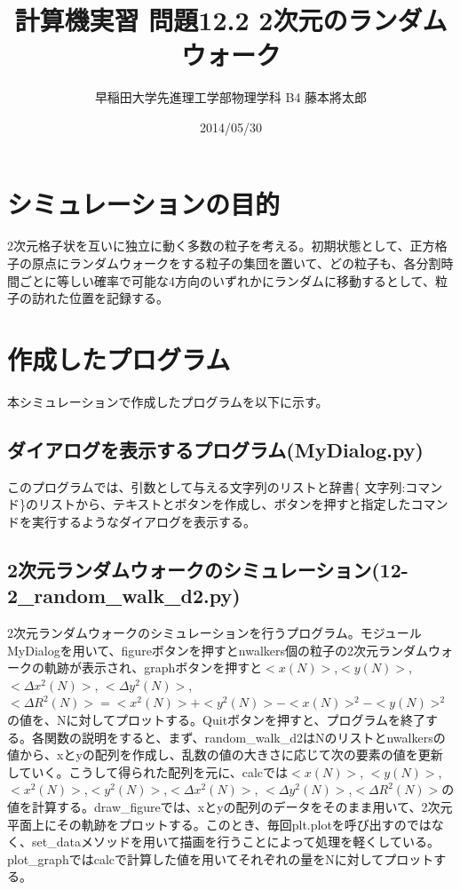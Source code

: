 \documentclass{jsarticle}
\title{計算機実習 問題12.2 2次元のランダムウォーク}
\author{早稲田大学先進理工学部物理学科 B4 藤本將太郎}
\date{2014/05/30}
\begin{document}
\maketitle
    
    \section{シミュレーションの目的}
        2次元格子状を互いに独立に動く多数の粒子を考える。初期状態として、正方格子の原点にランダムウォークをする粒子の集団を置いて、どの粒子も、各分割時間ごとに等しい確率で可能な4方向のいずれかにランダムに移動するとして、粒子の訪れた位置を記録する。
    \section{作成したプログラム}
        本シミュレーションで作成したプログラムを以下に示す。
    
    
        \subsection{ダイアログを表示するプログラム(MyDialog.py)}
        このプログラムでは、引数として与える文字列のリストと辞書\{ 文字列:コマンド\}のリストから、テキストとボタンを作成し、ボタンを押すと指定したコマンドを実行するようなダイアログを表示する。
        
        \subsection{2次元ランダムウォークのシミュレーション(12-2\_random\_walk\_d2.py)}
        2次元ランダムウォークのシミュレーションを行うプログラム。モジュールMyDialogを用いて、figureボタンを押すとnwalkers個の粒子の2次元ランダムウォークの軌跡が表示され、graphボタンを押すと$<x(N)>$,$<y(N)>$,$<\Delta x^{2}(N)>$, $<\Delta y^{2}(N)>$,$<\Delta R^{2}(N)> = <x^{2}(N)> + <y^{2}(N)> -<x(N)>^{2} -<y(N)>^{2}$の値を、Nに対してプロットする。Quitボタンを押すと、プログラムを終了する。各関数の説明をすると、まず、random\_walk\_d2はNのリストとnwalkersの値から、xとyの配列を作成し、乱数の値の大きさに応じて次の要素の値を更新していく。こうして得られた配列を元に、calcでは$<x(N)>$, $<y(N)>$,$<x^{2}(N)>$,$<y^{2}(N)>$,$<\Delta x^{2}(N)>$, $<\Delta y^{2}(N)>$,$<\Delta R^{2}(N)>$の値を計算する。draw\_figureでは、xとyの配列のデータをそのまま用いて、2次元平面上にその軌跡をプロットする。このとき、毎回plt.plotを呼び出すのではなく、set\_dataメソッドを用いて描画を行うことによって処理を軽くしている。plot\_graphではcalcで計算した値を用いてそれぞれの量をNに対してプロットする。
\end{document}
